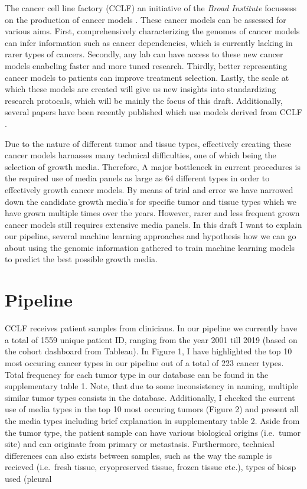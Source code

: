 \documentclass[11pt,]{article}
\begin{document}
The cancer cell line factory (CCLF) an initiative of the \emph{Broad
Institute} focussess on the production of cancer models
\citep{Boehm2015}. These cancer models can be assessed for various aims.
First, comprehensively characterizing the genomes of cancer models can
infer information such as cancer dependencies, which is currently
lacking in rarer types of cancers. Secondly, any lab can have access to
these new cancer models enabeling faster and more tuned research.
Thirdly, better representing cancer models to patients can improve
treatment selection. Lastly, the scale at which these models are created
will give us new insights into standardizing research protocals, which
will be mainly the focus of this draft. Additionally, several papers
have been recently published which use models derived from CCLF
\citep[\citet{Ben-David2017}, \citet{Viswanathan2017},
\citet{Joung2017}]{Hong2016}.

Due to the nature of different tumor and tissue types, effectively
creating these cancer models harnasses many technical difficulties, one
of which being the selection of growth media. Therefore, A major
bottleneck in current procedures is the required use of media panels as
large as 64 different types in order to effectively growth cancer
models. By means of trial and error we have narrowed down the candidate
growth media's for specific tumor and tissue types which we have grown
multiple times over the years. However, rarer and less frequent grown
cancer models still requires extensive media panels. In this draft I
want to explain our pipeline, several machine learning approaches and
hypothesis how we can go about using the genomic information gathered to
train machine learning models to predict the best possible growth media.

\hypertarget{pipeline}{%
\section{Pipeline}\label{pipeline}}

CCLF receives patient samples from clinicians. In our pipeline we
currently have a total of 1559 unique patient ID, ranging from the year
2001 till 2019 (based on the cohort dashboard from Tableau). In Figure
1, I have highlighted the top 10 most occuring cancer types in our
pipeline out of a total of 223 cancer types. Total frequency for each
tumor type in our database can be found in the supplementary table 1.
Note, that due to some inconsistency in naming, multiple similar tumor
types consists in the database. Additionally, I checked the current use
of media types in the top 10 most occuring tumors (Figure 2) and present
all the media types including brief explanation in supplementary table
2. Aside from the tumor type, the patient sample can have various
biological origins (i.e.~tumor site) and can originate from primary or
metastasis. Furthermore, technical differences can also exists between
samples, such as the way the sample is recieved (i.e.~fresh tissue,
cryopreserved tissue, frozen tissue etc.), types of biosp used (pleural
\end{document}
